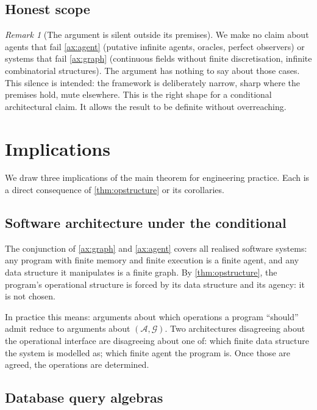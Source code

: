 \documentclass[11pt,a4paper]{article}
\theoremstyle{thmstyle}
\theoremstyle{definition}
\theoremstyle{remark}
\newtheorem{remark}[theorem]{Remark}
\newcommand{\Graph}{\mathcal{G}}
\newcommand{\Agent}{\mathcal{A}}
\begin{document}
\subsection{Honest scope}

\begin{remark}[The argument is silent outside its premises]
\label{rem:silent}
We make no claim about agents that fail \cref{ax:agent} (putative
infinite agents, oracles, perfect observers) or systems that fail
\cref{ax:graph} (continuous fields without finite discretisation,
infinite combinatorial structures). The argument has nothing to
say about those cases. This silence is intended: the framework is
deliberately narrow, sharp where the premises hold, mute elsewhere.
This is the right shape for a conditional architectural claim. It
allows the result to be definite without overreaching.
\end{remark}

\section{Implications}
\label{sec:implications}

We draw three implications of the main theorem for engineering
practice. Each is a direct consequence of \cref{thm:opstructure} or
its corollaries.

\subsection{Software architecture under the conditional}

The conjunction of \cref{ax:graph} and \cref{ax:agent} covers all
realised software systems: any program with finite memory and
finite execution is a finite agent, and any data structure it
manipulates is a finite graph. By \cref{thm:opstructure}, the
program's operational structure is forced by its data structure and
its agency: it is not chosen.

In practice this means: arguments about which operations a program
``should'' admit reduce to arguments about $(\Agent, \Graph)$.
Two architectures disagreeing about the operational interface are
disagreeing about one of: which finite data structure the system is
modelled as; which finite agent the program is. Once those are
agreed, the operations are determined.

\subsection{Database query algebras}
\end{document}
